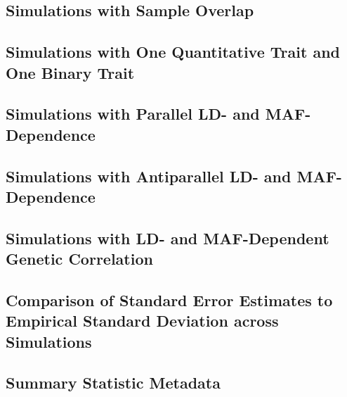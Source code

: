 \documentclass[11pt]{article}
\numberwithin{equation}{section}
\numberwithin{definition}{section}
\numberwithin{thm}{section}
\numberwithin{lemma}{section}
\numberwithin{prop}{section}
\numberwithin{cor}{section}
\numberwithin{hyp}{section}
\begin{document}
\subsection{Simulations with Sample Overlap}
\label{sample_overlap_sim}

\newpage

\newpage
\subsection{Simulations with One Quantitative Trait and One Binary Trait}
\label{qt_cc_sim}


\newpage
\subsection{Simulations with Parallel LD- and MAF-Dependence}
\label{parallel}



\newpage
\subsection{Simulations with Antiparallel LD- and MAF-Dependence}
\label{antiparallel}



\newpage
\subsection{Simulations with LD- and MAF-Dependent Genetic Correlation}
\label{depcor}



\newpage
\subsection{Comparison of Standard Error Estimates to Empirical Standard Deviation across Simulations}
\label{se_sim}



%


\newpage
\subsection{Summary Statistic Metadata}


\newpage


\end{document}
